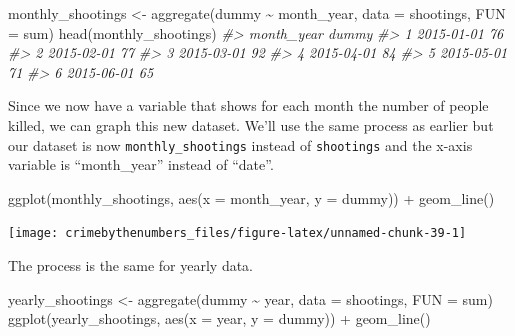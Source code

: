 \documentclass[
  12pt,
  openany]{book}
\newenvironment{Shaded}{\begin{snugshade}}{\end{snugshade}}
\newcommand{\AttributeTok}[1]{\textcolor[rgb]{0.61,0.61,0.61}{#1}}
\newcommand{\CommentTok}[1]{\textcolor[rgb]{0.37,0.37,0.37}{\textit{#1}}}
\newcommand{\FunctionTok}[1]{\textcolor[rgb]{0,0,0}{#1}}
\newcommand{\NormalTok}[1]{#1}
\newcommand{\OtherTok}[1]{\textcolor[rgb]{0.37,0.37,0.37}{#1}}
\newcommand{\SpecialCharTok}[1]{\textcolor[rgb]{0,0,0}{#1}}
\begin{document}
\begin{Shaded}
\begin{Highlighting}[]
\NormalTok{monthly\_shootings }\OtherTok{\textless{}{-}} \FunctionTok{aggregate}\NormalTok{(dummy }\SpecialCharTok{\textasciitilde{}}\NormalTok{ month\_year, }\AttributeTok{data =}\NormalTok{ shootings, }\AttributeTok{FUN =}\NormalTok{ sum)}
\FunctionTok{head}\NormalTok{(monthly\_shootings)}
\CommentTok{\#\textgreater{}   month\_year dummy}
\CommentTok{\#\textgreater{} 1 2015{-}01{-}01    76}
\CommentTok{\#\textgreater{} 2 2015{-}02{-}01    77}
\CommentTok{\#\textgreater{} 3 2015{-}03{-}01    92}
\CommentTok{\#\textgreater{} 4 2015{-}04{-}01    84}
\CommentTok{\#\textgreater{} 5 2015{-}05{-}01    71}
\CommentTok{\#\textgreater{} 6 2015{-}06{-}01    65}
\end{Highlighting}
\end{Shaded}

Since we now have a variable that shows for each month the number of people killed, we can graph this new dataset. We'll use the same process as earlier but our dataset is now \texttt{monthly\_shootings} instead of \texttt{shootings} and the x-axis variable is ``month\_year'' instead of ``date''.

\begin{Shaded}
\begin{Highlighting}[]
\FunctionTok{ggplot}\NormalTok{(monthly\_shootings, }\FunctionTok{aes}\NormalTok{(}\AttributeTok{x =}\NormalTok{ month\_year, }\AttributeTok{y =}\NormalTok{ dummy)) }\SpecialCharTok{+}
  \FunctionTok{geom\_line}\NormalTok{()}
\end{Highlighting}
\end{Shaded}

\begin{center}\texttt{[image: crimebythenumbers\_files/figure-latex/unnamed-chunk-39-1]} \end{center}

The process is the same for yearly data.

\begin{Shaded}
\begin{Highlighting}[]
\NormalTok{yearly\_shootings }\OtherTok{\textless{}{-}} \FunctionTok{aggregate}\NormalTok{(dummy }\SpecialCharTok{\textasciitilde{}}\NormalTok{ year, }\AttributeTok{data =}\NormalTok{ shootings, }\AttributeTok{FUN =}\NormalTok{ sum)}
\FunctionTok{ggplot}\NormalTok{(yearly\_shootings, }\FunctionTok{aes}\NormalTok{(}\AttributeTok{x =}\NormalTok{ year, }\AttributeTok{y =}\NormalTok{ dummy)) }\SpecialCharTok{+}
  \FunctionTok{geom\_line}\NormalTok{()}
\end{Highlighting}
\end{Shaded}
\end{document}
